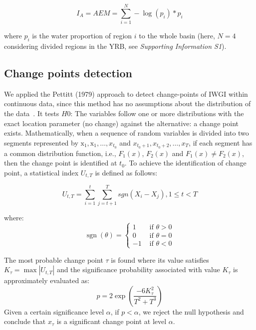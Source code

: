 	\begin{equation}
		I_A = AEM = \sum_{i=1}^N - \log(p_{i}) * p_{i}
	\end{equation}

	where $p_{i}$ is the water proportion of region $i$ to the whole basin (here, $N=4$ considering divided regions in the YRB, see \textit{Supporting Information S1}).

	\subsection{Change points detection}
		We applied the Pettitt (1979) approach to detect change-points of IWGI within continuous data, since this method has no assumptions about the distribution of the data~\cite{pettitt1979}.
		It tests $H0$: The variables follow one or more distributions with the exact location parameter (no change) against the alternative: a change point exists.
		Mathematically, when a sequence of random variables is divided into two segments represented by $\mathrm{x}_{1}, \mathrm{x}_{1}, \ldots, x_{t_{0}}$ and $x_{t_{0}+1}, x_{t_{0}+2}, \ldots, x_{T}$, if each segment has a common distribution function, i.e., $F_1(x)$, $F_2(x)$ and $F_1(x) \neq F_2(x)$, then the change point is identified at $t_0$. To achieve the identification of change point, a statistical index $U_{t,T}$ is defined as follows:

		\begin{equation}
			U_{t, T} = \sum_{i=1}^t\sum_{j=t+1}^T sgn(X_i - X_j), 1 \leq t < T
		\end{equation}

		where:
		\begin{equation}
			\operatorname{sgn}(\theta)= \begin{cases}1 & \text { if } \theta>0 \\ 0 & \text { if } \theta=0 \\ -1 & \text { if } \theta<0\end{cases}
		\end{equation}

		The most probable change point $\tau$ is found where its value satisfies $K_{\tau} = \max|U_{t, T}|$ and the significance probability associated with value $K_{\tau}$ is approximately evaluated as:
		\begin{equation}
			p=2 \exp \left(\frac{-6 K_{\tau}^{2}}{T^{2}+T^{3}}\right)
		\end{equation}
		Given a certain significance level $\alpha$, if $p < \alpha$, we reject the null hypothesis and conclude that $x_{\tau}$ is a significant change point at level $\alpha$.

